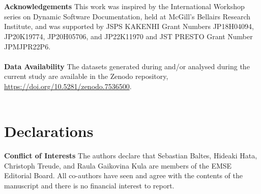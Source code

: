 \documentclass[smallextended]{svjour3}       %
\begin{document}
\section*{}

\textbf{Acknowledgements} This work was inspired by the International Workshop series on Dynamic Software
Documentation, held at McGill’s Bellairs Research Institute, and was supported by JSPS KAKENHI Grant Numbers JP18H04094, JP20K19774, JP20H05706, and JP22K11970 and JST PRESTO Grant Number JPMJPR22P6.
\\
\\
\noindent \textbf{Data Availability} The datasets generated during and/or analysed during the current study are available in
the Zenodo repository, \url{https://doi.org/10.5281/zenodo.7536500}.
\\
\\
%
\section*{Declarations}
\textbf{Conflict of Interests} The authors declare that Sebastian Baltes, Hideaki
Hata, Christoph Treude, and Raula Gaikovina Kula are members of the EMSE Editorial Board.
All co-authors have seen and agree with the contents of the manuscript and there is no financial interest to report. 




\end{document}
